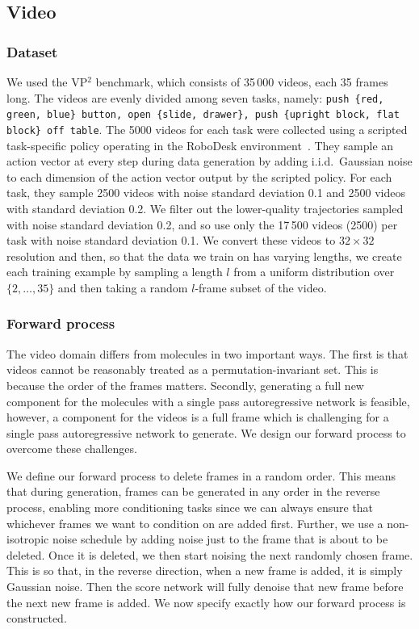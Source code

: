 \subsection{Video}
\subsubsection{Dataset}
We used the VP$^2$ benchmark, which consists of 35\,000 videos, each 35 frames long. The videos are evenly divided among seven tasks, namely: \texttt{push \{red, green, blue\} button, open \{slide, drawer\}, push \{upright block, flat block\} off table}. The 5000 videos for each task were collected using a scripted task-specific policy operating in the RoboDesk environment~\citep{kannan2021robodesk}. They sample an action vector at every step during data generation by adding i.i.d.\ Gaussian noise to each dimension of the action vector output by the scripted policy. For each task, they sample 2500 videos with noise standard deviation 0.1 and 2500 videos with standard deviation 0.2. We filter out the lower-quality trajectories sampled with noise standard deviation 0.2, and so use only the 17\,500 videos (2500) per task with noise standard deviation 0.1. We convert these videos to $32\times32$ resolution and then, so that the data we train on has varying lengths, we create each training example by sampling a length $l$ from a uniform distribution over $\{2,\ldots,35\}$ and then taking a random $l$-frame subset of the video.

\subsubsection{Forward process}
The video domain differs from molecules in two important ways. The first is that videos cannot be reasonably treated as a permutation-invariant set. This is because the order of the frames matters. Secondly, generating a full new component for the molecules with a single pass autoregressive network is feasible, however, a component for the videos is a full frame which is challenging for a single pass autoregressive network to generate. We design our forward process to overcome these challenges.

We define our forward process to delete frames in a random order. This means that during generation, frames can be generated in any order in the reverse process, enabling more conditioning tasks since we can always ensure that whichever frames we want to condition on are added first. Further, we use a non-isotropic noise schedule by adding noise just to the frame that is about to be deleted. Once it is deleted, we then start noising the next randomly chosen frame. This is so that, in the reverse direction, when a new frame is added, it is simply Gaussian noise. Then the score network will fully denoise that new frame before the next new frame is added. We now specify exactly how our forward process is constructed.


